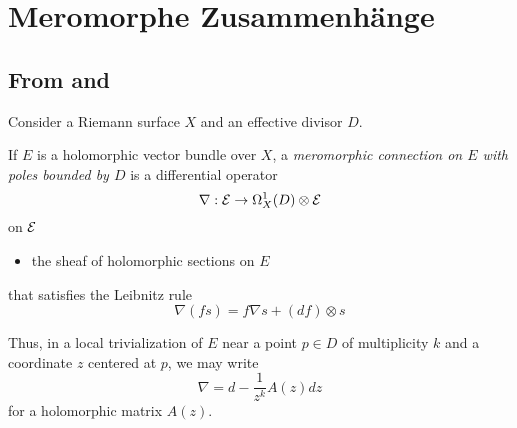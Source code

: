 \chapter{Meromorphe Zusammenhänge}
\begin{comment}
  Siehe:
  \begin{itemize}
    \item \cite{boalch} and \cite{thboalch}
    \item \cite{sabbah2007isomonodromic}
  \end{itemize}
\end{comment}

\section{From \cite{thpym} and \cite{citeulike:12387686}}
Consider a Riemann surface $X$ and an effective divisor $D$.
\begin{defn}
  If $E$ is a holomorphic vector bundle over $X$, a \emph{meromorphic connection
  on $E$ with poles bounded by $D$} is a differential operator
  \[
    \nabla:\mathcal{E}\to\Omega_X^1(D)\otimes\mathcal{E}
  \]
  on $\mathcal{E}$
  \begin{itemize}
    \item the sheaf of holomorphic sections on $E$
  \end{itemize}
  that satisfies the Leibnitz rule
  \[
    \nabla(fs)=f\nabla s + (df)\otimes s
  \]
  \begin{rem}
    Thus, in a local trivialization of $E$ near a point $p\in D$ of
    multiplicity $k$ and a coordinate $z$ centered at $p$, we may write
    \[
      \nabla=d-\frac{1}{z^k}A(z)dz
    \]
    for a holomorphic matrix $A(z)$.
  \end{rem}
\end{defn}

